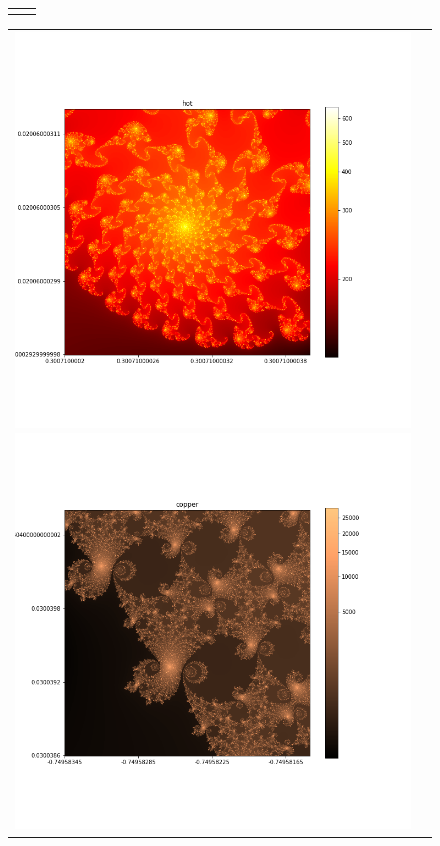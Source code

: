 \documentclass[uplatex,a4paper,11pt,oneside,openany]{jsbook}
\begin{document}
\begin{figure}[H]
\begin{tabular}{cc}
\begin{minipage}{0.5\hsize}
    \end{minipage}
  \end{tabular}
  \begin{tabular}{cc}
    \begin{minipage}{0.5\hsize}
      \centering
      \includegraphics[clip,scale=0.3]{../src/figure/fig003.png}
    \end{minipage}
    \begin{minipage}{0.5\hsize}
      \centering
      \includegraphics[clip,scale=0.3]{../src/figure/fig004.png}

\end{minipage}
\end{tabular}
\end{figure}
\end{document}
